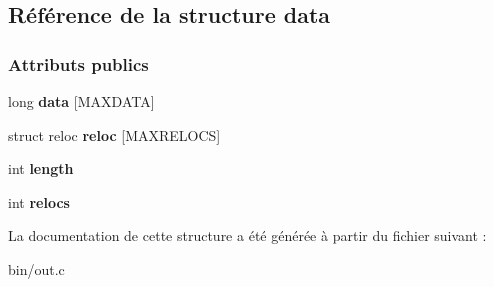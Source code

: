 \hypertarget{structdata}{}\subsection{Référence de la structure data}
\label{structdata}
\subsubsection*{Attributs publics}
\begin{DoxyCompactItemize}
\item 
\hypertarget{structdata_ac96c6a0d863da21a72539ed46f1bf2d1}{}\label{structdata_ac96c6a0d863da21a72539ed46f1bf2d1} 
long {\bfseries data} \mbox{[}M\+A\+X\+D\+A\+TA\mbox{]}
\item 
\hypertarget{structdata_ab8d8f9e85a8b063ef72a7bb93a2273c1}{}\label{structdata_ab8d8f9e85a8b063ef72a7bb93a2273c1} 
struct reloc {\bfseries reloc} \mbox{[}M\+A\+X\+R\+E\+L\+O\+CS\mbox{]}
\item 
\hypertarget{structdata_ab1464d70ed28af0a16cdd2ebaa64027c}{}\label{structdata_ab1464d70ed28af0a16cdd2ebaa64027c} 
int {\bfseries length}
\item 
\hypertarget{structdata_aa05a3dbeef100101ca69bb4e49f37b32}{}\label{structdata_aa05a3dbeef100101ca69bb4e49f37b32} 
int {\bfseries relocs}
\end{DoxyCompactItemize}


La documentation de cette structure a été générée à partir du fichier suivant \+:\begin{DoxyCompactItemize}
\item 
bin/out.\+c\end{DoxyCompactItemize}
